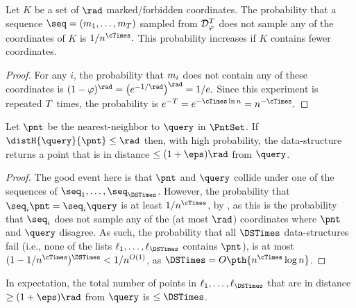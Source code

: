 \begin{lemma}
    Let $K$ be a set of $\rad$ marked/forbidden coordinates. The
    probability that a sequence
    $\seq = (\subseq_1,\ldots, \subseq_\tTimes)$ sampled from
    $\mathcal{D}_{\varphi}^T$ does not sample any of the coordinates of
    $K$ is
    \begin{math}
        1/n^{\cTimes}.
    \end{math}
    This probability increases if $K$ contains fewer coordinates.
\end{lemma}

\begin{proof}
    For any $i$, the probability that ${{m}}_i$ does not contain any
    of these coordinates is
    \begin{math}
        (1-\pr)^\rad%
        =%
        \bigl(e^{-1/\rad }\bigr)^{\rad}%
        =%
        1/e.
    \end{math}
    Since this experiment is repeated $T$ times, the probability
    is
    \begin{math}
        e^{-\tTimes}%
        =%
        e^{ - \cTimes \ln n}%
        =%
        n^{- \cTimes}.
    \end{math}
    \qquad
\end{proof}


\begin{lemma}
    Let $\pnt$ be the nearest-neighbor to $\query$ in $\PntSet$.  If
    $\distH{\query}{\pnt} \leq \rad$ then, with high probability, the
    data-structure returns a point that is in distance
    $\leq (1+\eps)\rad$ from $\query$.
\end{lemma}
\begin{proof}
    The good event here is that $\pnt$ and $\query$ collide under
    one of the sequences of $\seq_1,\ldots, \seq_\DSTimes$.  However,
    the probability that $\seq_i \pnt = \seq_i \query$ is at least
    $1/n^{\cTimes}$, by , as this is the
    probability that $\seq_i$ does not sample any of the (at most
    $\rad$) coordinates where $\pnt$ and $\query$ disagree. As such,
    the probability that all $\DSTimes$ data-structures fail (i.e.,
    none of the lists $\ell_1,\ldots, \ell_\DSTimes$ contains $\pnt$),
    is at most $(1- 1/n^{\cTimes})^{\DSTimes} < 1/n^{O(1)}$, as
    $\DSTimes = O\pth{ n^{\cTimes} \log n}$.
\end{proof}

\begin{lemma}
     In expectation, the total number of points in
        $\ell_1,\ldots, \ell_\DSTimes$ that are in distance
        $\geq (1+\eps)\rad$ from $\query$ is $\leq \DSTimes$.
\end{lemma}

